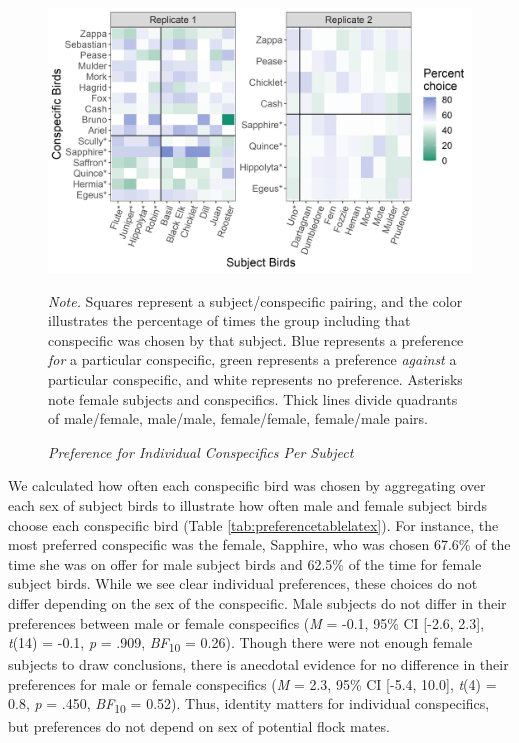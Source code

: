 \documentclass[
  ,pub,floatsintext]{apa6}
\begin{document}
\begin{figure}[t]
\caption{\newline \emph{Preference for Individual Conspecifics Per Subject} \label{fig:individualpref}}
\begin{center}
\includegraphics[width=\linewidth]{"figures/individual_preference.png"}
\end{center}

\textit{Note.} Squares represent a subject/conspecific pairing, and the color illustrates the percentage of times the group including that conspecific was chosen by that subject. Blue represents a preference \emph{for} a particular conspecific, green represents a preference \emph{against} a particular conspecific, and white represents no preference. Asterisks note female subjects and conspecifics. Thick lines divide quadrants of male/female, male/male, female/female, female/male pairs.
\end{figure}

We calculated how often each conspecific bird was chosen by aggregating over each sex of subject birds to illustrate how often male and female subject birds choose each conspecific bird (Table \ref{tab:preferencetablelatex}). For instance, the most preferred conspecific was the female, Sapphire, who was chosen 67.6\% of the time she was on offer for male subject birds and 62.5\% of the time for female subject birds. While we see clear individual preferences, these choices do not differ depending on the sex of the conspecific. Male subjects do not differ in their preferences between male or female conspecifics (\emph{M} = -0.1, 95\% CI {[}-2.6, 2.3{]}, \emph{t}(14) = -0.1, \emph{p} = .909, \emph{BF}\textsubscript{10} = 0.26). Though there were not enough female subjects to draw conclusions, there is anecdotal evidence for no difference in their preferences for male or female conspecifics (\emph{M} = 2.3, 95\% CI {[}-5.4, 10.0{]}, \emph{t}(4) = 0.8, \emph{p} = .450, \emph{BF}\textsubscript{10} = 0.52). Thus, identity matters for individual conspecifics, but preferences do not depend on sex of potential flock mates.
\end{document}

